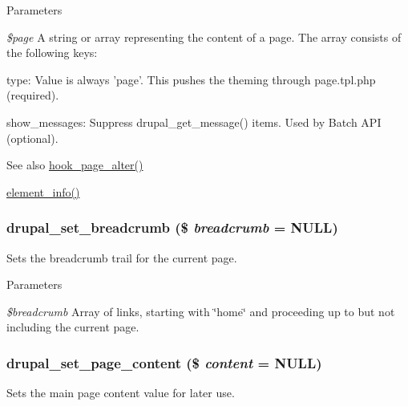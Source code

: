 \begin{DoxyParams}{Parameters}
\item[{\em \$page}]A string or array representing the content of a page. The array consists of the following keys:
\begin{DoxyItemize}
\item type: Value is always 'page'. This pushes the theming through page.tpl.php (required).
\item show\_\-messages: Suppress drupal\_\-get\_\-message() items. Used by Batch API (optional).
\end{DoxyItemize}\end{DoxyParams}
\begin{DoxySeeAlso}{See also}
\hyperlink{group__hooks_gaa965aa8f38b48aed1a19c556c199145f}{hook\_\-page\_\-alter()} 

\hyperlink{common_8inc_a5745b4e27c2946a902d49c0923f46739}{element\_\-info()} 
\end{DoxySeeAlso}
\hypertarget{common_8inc_a666113d06fa6ea461aff580e5c511eb0}{
\subsubsection[{drupal\_\-set\_\-breadcrumb}]{\setlength{\rightskip}{0pt plus 5cm}drupal\_\-set\_\-breadcrumb (\$ {\em breadcrumb} = {\ttfamily NULL})}}
\label{common_8inc_a666113d06fa6ea461aff580e5c511eb0}
Sets the breadcrumb trail for the current page.


\begin{DoxyParams}{Parameters}
\item[{\em \$breadcrumb}]Array of links, starting with \char`\"{}home\char`\"{} and proceeding up to but not including the current page. \end{DoxyParams}
\hypertarget{common_8inc_a87c72c30529e99da7d4b25b6c1e00b1d}{
\subsubsection[{drupal\_\-set\_\-page\_\-content}]{\setlength{\rightskip}{0pt plus 5cm}drupal\_\-set\_\-page\_\-content (\$ {\em content} = {\ttfamily NULL})}}
\label{common_8inc_a87c72c30529e99da7d4b25b6c1e00b1d}
Sets the main page content value for later use.

